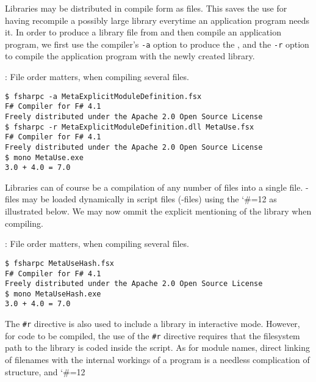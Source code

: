 Libraries may be distributed in compile form as  files. This saves the use for having recompile a possibly large library everytime an application program needs it. In order to produce a library file from  and then compile an application program, we first use the compiler's \lstinline[language=console]{-a} option to produce the , and the \lstinline[language=console]{-r} option to compile the application program with the newly created library.
\begin{codeNOutput}{: File order matters, when compiling several files.}
\begin{lstlisting}[language=console,escapechar=§]
$ fsharpc -a MetaExplicitModuleDefinition.fsx
F# Compiler for F# 4.1
Freely distributed under the Apache 2.0 Open Source License
$ fsharpc -r MetaExplicitModuleDefinition.dll MetaUse.fsx 
F# Compiler for F# 4.1
Freely distributed under the Apache 2.0 Open Source License
$ mono MetaUse.exe 
3.0 + 4.0 = 7.0
\end{lstlisting}%
\end{codeNOutput}
Libraries can of course be a compilation of any number of files into a single  file. -files may be loaded dynamically in script files (-files) using the 
\begingroup %
\catcode`\#=12
\endgroup
as illustrated below.
%
%
We may now ommit the explicit mentioning of the library when compiling.
\begin{codeNOutput}{: File order matters, when compiling several files.}
\begin{lstlisting}[language=console,escapechar=§]
$ fsharpc MetaUseHash.fsx 
F# Compiler for F# 4.1
Freely distributed under the Apache 2.0 Open Source License
$ mono MetaUseHash.exe 
3.0 + 4.0 = 7.0
\end{lstlisting}
\end{codeNOutput}
The \lstinline{#r} directive is also used to include a library in interactive mode. However, for code to be compiled, the use of the \lstinline{#r} directive requires that the filesystem path to the library is coded inside the script. As for module names, direct linking of filenames with the internal workings of a program is a needless complication of structure, and 
\begingroup %
\catcode`\#=12
\endgroup

